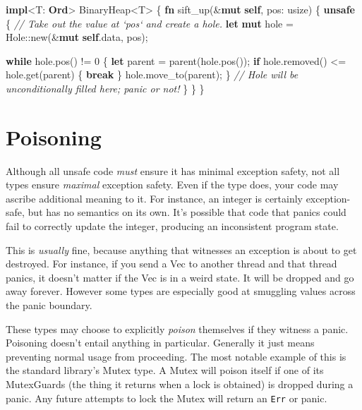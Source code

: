 \documentclass[a4paper,]{book}
\newenvironment{Shaded}{\begin{snugshade}}{\end{snugshade}}
\newcommand{\KeywordTok}[1]{\textcolor[rgb]{0.13,0.29,0.53}{\textbf{{#1}}}}
\newcommand{\DecValTok}[1]{\textcolor[rgb]{0.00,0.00,0.81}{{#1}}}
\newcommand{\CommentTok}[1]{\textcolor[rgb]{0.56,0.35,0.01}{\textit{{#1}}}}
\newcommand{\NormalTok}[1]{{#1}}
\begin{document}
\begin{Shaded}
\begin{Highlighting}[]
\KeywordTok{impl}\NormalTok{<T: }\KeywordTok{Ord}\NormalTok{> BinaryHeap<T> \{}
    \KeywordTok{fn} \NormalTok{sift_up(&}\KeywordTok{mut} \KeywordTok{self}\NormalTok{, pos: usize) \{}
        \KeywordTok{unsafe} \NormalTok{\{}
            \CommentTok{// Take out the value at `pos` and create a hole.}
            \KeywordTok{let} \KeywordTok{mut} \NormalTok{hole = Hole::new(&}\KeywordTok{mut} \KeywordTok{self}\NormalTok{.data, pos);}

            \KeywordTok{while} \NormalTok{hole.pos() != }\DecValTok{0} \NormalTok{\{}
                \KeywordTok{let} \NormalTok{parent = parent(hole.pos());}
                \KeywordTok{if} \NormalTok{hole.removed() <= hole.get(parent) \{ }\KeywordTok{break} \NormalTok{\}}
                \NormalTok{hole.move_to(parent);}
            \NormalTok{\}}
            \CommentTok{// Hole will be unconditionally filled here; panic or not!}
        \NormalTok{\}}
    \NormalTok{\}}
\NormalTok{\}}
\end{Highlighting}
\end{Shaded}

\section{Poisoning}\label{sec--poisoning}

Although all unsafe code \emph{must} ensure it has minimal exception
safety, not all types ensure \emph{maximal} exception safety. Even if
the type does, your code may ascribe additional meaning to it. For
instance, an integer is certainly exception-safe, but has no semantics
on its own. It's possible that code that panics could fail to correctly
update the integer, producing an inconsistent program state.

This is \emph{usually} fine, because anything that witnesses an
exception is about to get destroyed. For instance, if you send a Vec to
another thread and that thread panics, it doesn't matter if the Vec is
in a weird state. It will be dropped and go away forever. However some
types are especially good at smuggling values across the panic boundary.

These types may choose to explicitly \emph{poison} themselves if they
witness a panic. Poisoning doesn't entail anything in particular.
Generally it just means preventing normal usage from proceeding. The
most notable example of this is the standard library's Mutex type. A
Mutex will poison itself if one of its MutexGuards (the thing it returns
when a lock is obtained) is dropped during a panic. Any future attempts
to lock the Mutex will return an \texttt{Err} or panic.
\end{document}
